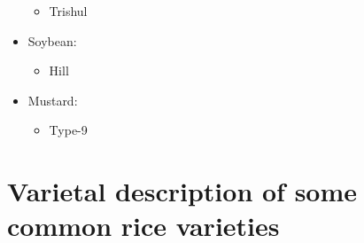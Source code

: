 \documentclass[]{book}
\providecommand{\tightlist}{%
  \setlength{\itemsep}{0pt}\setlength{\parskip}{0pt}}
\begin{document}
\begin{itemize}
  \begin{itemize}
  \tightlist
  \item
    Trishul
  \end{itemize}
\item
  Soybean:

  \begin{itemize}
  \tightlist
  \item
    Hill
  \end{itemize}
\item
  Mustard:

  \begin{itemize}
  \tightlist
  \item
    Type-9
  \end{itemize}
\end{itemize}

\hypertarget{varietal-description-of-some-common-rice-varieties}{%
\section{Varietal description of some common rice varieties}\label{varietal-description-of-some-common-rice-varieties}}
\end{document}
